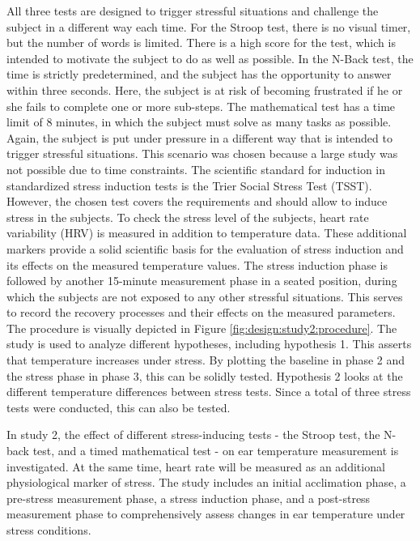 All three tests are designed to trigger stressful situations and challenge the subject in a different way each time.
For the Stroop test, there is no visual timer, but the number of words is limited. 
There is a high score for the test, which is intended to motivate the subject to do as well as possible. 
In the N-Back test, the time is strictly predetermined, and the subject has the opportunity to answer within three seconds.
Here, the subject is at risk of becoming frustrated if he or she fails to complete one or more sub-steps.
The mathematical test has a time limit of 8 minutes, in which the subject must solve as many tasks as possible.
Again, the subject is put under pressure in a different way that is intended to trigger stressful situations.
This scenario was chosen because a large study was not possible due to time constraints. 
The scientific standard for induction in standardized stress induction tests is the Trier Social Stress Test (TSST). 
However, the chosen test covers the requirements and should allow to induce stress in the subjects.
To check the stress level of the subjects, heart rate variability (HRV) is measured in addition to temperature data. 
These additional markers provide a solid scientific basis for the evaluation of stress induction and its effects on the measured temperature values.
The stress induction phase is followed by another 15-minute measurement phase in a seated position, during which the subjects are not exposed to any other stressful situations. 
This serves to record the recovery processes and their effects on the measured parameters. 
The procedure is visually depicted in Figure \ref{fig:design:study2:procedure}.
The study is used to analyze different hypotheses, including hypothesis 1. 
This asserts that temperature increases under stress.
By plotting the baseline in phase 2 and the stress phase in phase 3, this can be solidly tested.
Hypothesis 2 looks at the different temperature differences between stress tests.
Since a total of three stress tests were conducted, this can also be tested.

In study 2, the effect of different stress-inducing tests - the Stroop test, the N-back test, and a timed mathematical test - on ear temperature measurement is investigated.
At the same time, heart rate will be measured as an additional physiological marker of stress. 
The study includes an initial acclimation phase, a pre-stress measurement phase, a stress induction phase, and a post-stress measurement phase to comprehensively assess changes in ear temperature under stress conditions.